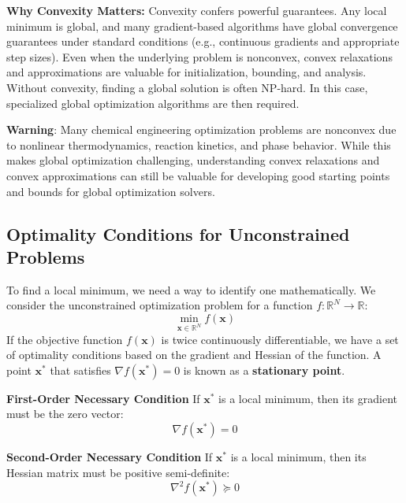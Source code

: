 \textbf{Why Convexity Matters:} Convexity confers powerful guarantees. Any local minimum is global, and many gradient-based algorithms have global convergence guarantees under standard conditions (e.g., continuous gradients and appropriate step sizes). Even when the underlying problem is nonconvex, convex relaxations and approximations are valuable for initialization, bounding, and analysis. Without convexity, finding a global solution is often NP-hard. In this case, specialized global optimization algorithms are then required.

\begin{warningBox}
    \textbf{Warning}: Many chemical engineering optimization problems are nonconvex due to nonlinear thermodynamics, reaction kinetics, and phase behavior. While this makes global optimization challenging, understanding convex relaxations and convex approximations can still be valuable for developing good starting points and bounds for global optimization solvers.
\end{warningBox}

\subsection{Optimality Conditions for Unconstrained Problems}
To find a local minimum, we need a way to identify one mathematically. We consider the unconstrained optimization problem for a function $f: \mathbb{R}^N \to \mathbb{R}$:
\begin{equation}
    \min_{\mathbf{x} \in \mathbb{R}^N} f(\mathbf{x})
\end{equation}
If the objective function $f(\mathbf{x})$ is twice continuously differentiable, we have a set of optimality conditions based on the gradient and Hessian of the function. A point $\mathbf{x}^*$ that satisfies $\nabla f(\mathbf{x}^*) = 0$ is known as a \textbf{stationary point}.

\begin{definitionBox}
\textbf{First-Order Necessary Condition}
If $\mathbf{x}^*$ is a local minimum, then its gradient must be the zero vector:
\begin{equation}
    \nabla f(\mathbf{x}^*) = 0
\end{equation}
\end{definitionBox}

\begin{definitionBox}
\textbf{Second-Order Necessary Condition}
If $\mathbf{x}^*$ is a local minimum, then its Hessian matrix must be positive semi-definite:
\begin{equation}
    \nabla^2 f(\mathbf{x}^*) \succeq 0
\end{equation}
\end{definitionBox}

